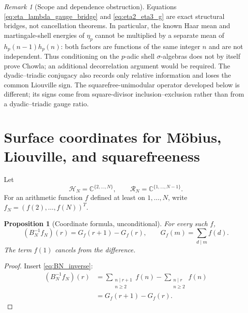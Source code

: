 \documentclass[11pt]{amsart}
\numberwithin{equation}{section}
\theoremstyle{plain}
\newtheorem{proposition}[theorem]{Proposition}
\theoremstyle{definition}
\theoremstyle{remark}
\newtheorem{remark}[theorem]{Remark}
\newcommand{\C}{\mathbb C}
\begin{document}
\begin{remark}[Scope and dependence obstruction]
\label{rem:dyadic_triadic_scope}
Equations \eqref{eq:eta_lambda_gauge_bridge} and \eqref{eq:eta2_eta3_g} are exact structural bridges, not cancellation theorems.  In particular, the known Haar mean and martingale-shell energies of $\eta_p$ cannot be multiplied by a separate mean of $h_p(n-1)h_p(n)$: both factors are functions of the same integer $n$ and are not independent.  Thus conditioning on the $p$-adic shell $\sigma$-algebras does not by itself prove Chowla; an additional decorrelation argument would be required.  The dyadic--triadic conjugacy also records only relative information and loses the common Liouville sign.  The squarefree-unimodular operator developed below is different; its signs come from square-divisor inclusion--exclusion rather than from a dyadic--triadic gauge ratio.
\end{remark}

\section{Surface coordinates for Möbius, Liouville, and squarefreeness}
\label{sec:coordinates}

Let
\begin{equation}
\mathcal H_N=\C^{\{2,\ldots,N\}},
\qquad
\mathcal R_N=\C^{\{1,\ldots,N-1\}}.
\label{eq:finite_spaces}
\end{equation}
For an arithmetic function $f$ defined at least on $1,\ldots,N$, write $f_N=(f(2),\ldots,f(N))^T$.

\begin{proposition}[Coordinate formula, unconditional]
\label{prop:coordinate_formula}
For every such $f$,
\begin{equation}
(B_N^{-1}f_N)(r)=G_f(r+1)-G_f(r),
\qquad
G_f(m)=\sum_{d\mid m}f(d).
\label{eq:coordinate_formula}
\end{equation}
The term $f(1)$ cancels from the difference.
\end{proposition}

\begin{proof}
Insert \eqref{eq:BN_inverse}:
\begin{align}
(B_N^{-1}f_N)(r)
&=\sum_{\substack{n\mid r+1\\n\ge2}}f(n)
-\sum_{\substack{n\mid r\\n\ge2}}f(n)
\label{eq:coordinate_formula_expand}\\
&=G_f(r+1)-G_f(r).
\label{eq:coordinate_formula_finish}
\end{align}
\end{proof}
\end{document}
